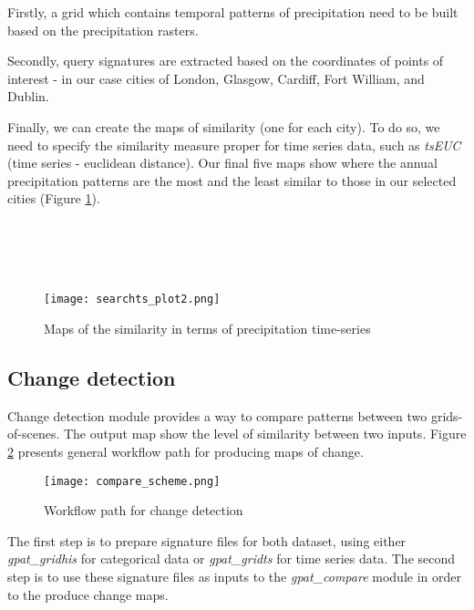 Firstly, a grid which contains temporal patterns of precipitation need to be built based on the precipitation rasters.

Secondly, query signatures are extracted based on the coordinates of points of interest - in our case cities of London, Glasgow, Cardiff, Fort William, and Dublin. 

Finally, we can create the maps of similarity (one for each city). 
To do so, we need to specify the similarity measure proper for time series data, such as {\it tsEUC} (time series - euclidean distance).
Our final five maps show where the annual precipitation patterns are the most and the least similar to those in our selected cities (Figure \ref{FIG:SEARCHTS2}). \\\\\\\\\\

\begin{figure}[H]
        \begin{center}
	\texttt{[image: searchts\_plot2.png]}
	\caption{Maps of the similarity in terms of precipitation time-series}
	\label{FIG:SEARCHTS2}
        \end{center}
\end{figure}

\FloatBarrier

\subsection{Change detection}

Change detection module provides a way to compare patterns between two grids-of-scenes.
The output map show the level of similarity between two inputs.
Figure \ref{FIG:CHANGE} presents general workflow path for producing maps of change. 

\begin{figure}[H]
	\centering
	\texttt{[image: compare\_scheme.png]}
	\caption{Workflow path for change detection}
	\label{FIG:CHANGE}
\end{figure}

The first step is to prepare signature files for both dataset, using either {\it gpat\_gridhis} for categorical data or {\it gpat\_gridts} for time series data.
The second step is to use these signature files as inputs to the {\it gpat\_compare} module in order to the produce change maps. \\\\

